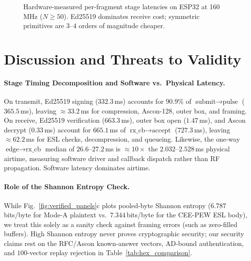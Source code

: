 \documentclass[conference]{IEEEtran}
\begin{document}
\begin{figure}[t]
\centering
{}
\caption{Hardware-measured per-fragment stage latencies on ESP32 at 160\,MHz ($N\ge50$). Ed25519 dominates receive cost; symmetric primitives are $3$--$4$ orders of magnitude cheaper.}
\label{fig:stage_timing}
\end{figure}

\section{Discussion and Threats to Validity}

\paragraph{Stage Timing Decomposition and Software vs.\ Physical Latency.} On transmit, Ed25519 signing ($332.3$\,ms) accounts for $90.9\%$ of $\text{submit}\rightarrow\text{pulse}$ ($365.5$\,ms), leaving $\approx 33.2$\,ms for compression, Ascon-128, outer box, and framing. On receive, Ed25519 verification ($663.3$\,ms), outer box open ($1.47$\,ms), and Ascon decrypt ($0.33$\,ms) account for $665.1$\,ms of $\text{rx\_cb}\rightarrow\text{accept}$ ($727.3$\,ms), leaving $\approx 62.2$\,ms for ESL checks, decompression, and queueing. Likewise, the one-way $\text{edge}\rightarrow\text{rx\_cb}$ median of $26.6$--$27.2$\,ms is $\approx 10\times$ the $2.032$--$2.528$\,ms physical airtime, measuring software driver and callback dispatch rather than RF propagation. Software latency dominates airtime.

\paragraph{Role of the Shannon Entropy Check.} While Fig.~\ref{fig:verified_panels}c plots pooled-byte Shannon entropy ($6.787$\,bits/byte for Mode-A plaintext vs.\ $7.344$\,bits/byte for the CEE-PEW ESL body), we treat this solely as a sanity check against framing errors (such as zero-filled buffers). High Shannon entropy never proves cryptographic security; our security claims rest on the RFC/Ascon known-answer vectors, AD-bound authentication, and $100$-vector replay rejection in Table~\ref{tab:hex_comparison}.
\end{document}
